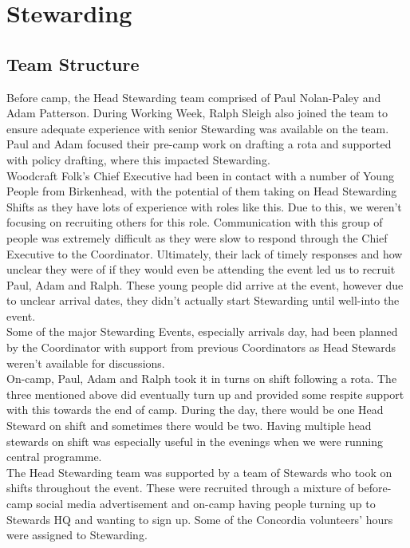 \chapter{Stewarding}
\section{Team Structure}
Before camp, the Head Stewarding team comprised of Paul Nolan-Paley and Adam Patterson. During Working Week, Ralph Sleigh also joined the team to ensure adequate experience with senior Stewarding was available on the team. Paul and Adam focused their pre-camp work on drafting a rota and supported with policy drafting, where this impacted Stewarding. \\

Woodcraft Folk's Chief Executive had been in contact with a number of Young People from Birkenhead, with the potential of them taking on Head Stewarding Shifts as they have lots of experience with roles like this. Due to this, we weren't focusing on recruiting others for this role. Communication with this group of people was extremely difficult as they were slow to respond through the Chief Executive to the Coordinator. Ultimately, their lack of timely responses and how unclear they were of if they would even be attending the event led us to recruit Paul, Adam and Ralph. These young people did arrive at the event, however due to unclear arrival dates, they didn't actually start Stewarding until well-into the event. \\

Some of the major Stewarding Events, especially arrivals day, had been planned by the Coordinator with support from previous Coordinators as Head Stewards weren't available for discussions.\\

On-camp, Paul, Adam and Ralph took it in turns on shift following a rota. The three mentioned above did eventually turn up and provided some respite support with this towards the end of camp. During the day, there would be one Head Steward on shift and sometimes there would be two. Having multiple head stewards on shift was especially useful in the evenings when we were running central programme.\\

The Head Stewarding team was supported by a team of Stewards who took on shifts throughout the event. These were recruited through a mixture of before-camp social media advertisement and on-camp having people turning up to Stewards HQ and wanting to sign up. Some of the Concordia volunteers' hours were assigned to Stewarding.

